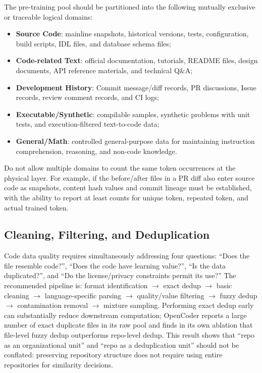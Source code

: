 \documentclass[10pt,a4paper,UTF8,fontset=none]{ctexart}
\begin{document}
The pre-training pool should be partitioned into the following mutually exclusive or traceable logical domains:

\begin{itemize}
  \item \textbf{Source Code}: mainline snapshots, historical versions, tests, configuration, build scripts, IDL files, and database schema files;
  \item \textbf{Code-related Text}: official documentation, tutorials, README files, design documents, API reference materials, and technical Q\&A;
  \item \textbf{Development History}: Commit message/diff records, PR discussions, Issue records, review comment records, and CI logs;
  \item \textbf{Executable/Synthetic}: compilable samples, synthetic problems with unit tests, and execution-filtered text-to-code data;
  \item \textbf{General/Math}: controlled general-purpose data for maintaining instruction comprehension, reasoning, and non-code knowledge.
\end{itemize}

Do not allow multiple domains to count the same token occurrences at the physical layer. For example, if the before/after files in a PR diff also enter source code as snapshots, content hash values and commit lineage must be established, with the ability to report at least counts for unique token, repeated token, and actual trained token.

\subsection{Cleaning, Filtering, and Deduplication}

Code data quality requires simultaneously addressing four questions: ``Does the file resemble code?'', ``Does the code have learning value?'', ``Is the data duplicated?'', and ``Do the license/privacy constraints permit its use?'' The recommended pipeline is: format identification $\rightarrow$ exact dedup $\rightarrow$ basic cleaning $\rightarrow$ language-specific parsing $\rightarrow$ quality/value filtering $\rightarrow$ fuzzy dedup $\rightarrow$ contamination removal $\rightarrow$ mixture sampling. Performing exact dedup early can substantially reduce downstream computation; OpenCoder reports a large number of exact duplicate files in its raw pool and finds in its own ablation that file-level fuzzy dedup outperforms repo-level dedup\cite{en:huang2024opencoder}. This result shows that ``repo as an organizational unit'' and ``repo as a deduplication unit'' should not be conflated: preserving repository structure does not require using entire repositories for similarity decisions.
\end{document}
